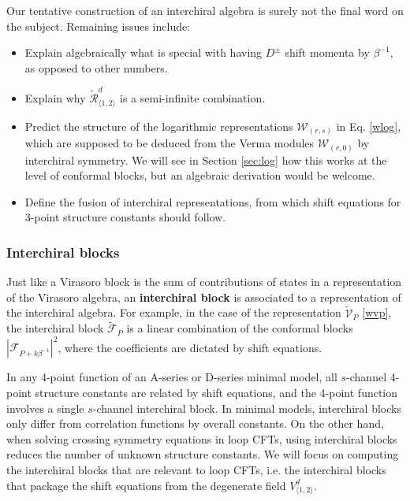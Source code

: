 \documentclass[12pt, a4paper]{article}
\newcommand{\myindex}[1]{\textbf{\boldmath #1}}
\begin{document}
Our tentative construction of an interchiral algebra is surely not the final word on the subject. Remaining issues include:
\begin{itemize}
\item Explain algebraically what is special with having $D^\pm$ shift momenta by $\beta^{-1}$, as opposed to other numbers.
 \item Explain why $\widetilde{\mathcal{R}}^d_{\langle 1,2\rangle}$ is a semi-infinite combination.
 \item Predict the structure of the logarithmic representations $\mathcal{W}_{(r,s)}$ in Eq. \eqref{wlog}, which are supposed to be deduced from the Verma modules $\mathcal{W}_{(r,0)}$ by interchiral symmetry. We will see in Section \ref{sec:log} how this works at the level of conformal blocks, but an algebraic derivation would be welcome. 
 \item Define the fusion of interchiral representations, from which shift equations for 3-point structure constants should follow.
\end{itemize}


\subsubsection{Interchiral blocks}\label{sec:ib}

Just like a Virasoro block is the sum of contributions of states in a representation of the Virasoro algebra, an \myindex{interchiral block} is associated to a representation of the interchiral algebra. For example, in the case of the representation $\widetilde{\mathcal{V}}_P$ \eqref{wvp}, the interchiral block $\widetilde{\mathcal{F}}_P$ is a linear combination of the conformal blocks $\left|\mathcal{F}_{P+k\beta^{-1}}\right|^2$, where the coefficients are dictated by shift equations.

In any 4-point function of an A-series or D-series minimal model, all $s$-channel 4-point structure constants are related by shift equations, and the 4-point function involves a single $s$-channel interchiral block. In minimal models, interchiral blocks only differ from correlation functions by overall constants. On the other hand, when solving crossing symmetry equations in loop CFTs, using interchiral blocks reduces the number of unknown structure constants. We will focus on computing the interchiral blocks that are relevant to loop CFTs, i.e. the interchiral blocks that package the shift equations from the degenerate field $V^d_{\langle 1,2\rangle}$.  
\end{document}
